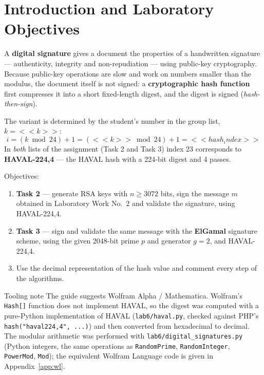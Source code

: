 \documentclass[12pt,a4paper]{article}
\begin{document}
\makereporttitle
\tableofcontents
\newpage

\section{Introduction and Laboratory Objectives}
A \textbf{digital signature} gives a document the properties of a handwritten signature —
authenticity, integrity and non-repudiation — using public-key cryptography. Because public-key
operations are slow and work on numbers smaller than the modulus, the document itself is not
signed: a \textbf{cryptographic hash function} first compresses it into a short fixed-length
digest, and the digest is signed (\emph{hash-then-sign}).

The variant is determined by the student's number in the group list, $k = <<k>>$:
\[
  i = (k \bmod 24) + 1 = (<<k>> \bmod 24) + 1 = <<hash_index>>
\]
In \emph{both} lists of the assignment (Task 2 and Task 3) index 23 corresponds to
\textbf{HAVAL-224,4} — the HAVAL hash with a 224-bit digest and 4 passes.

Objectives:
\begin{enumerate}
  \item \textbf{Task 2} — generate RSA keys with $n \ge 3072$ bits, sign the message $m$ obtained
        in Laboratory Work No.~2 and validate the signature, using HAVAL-224,4.
  \item \textbf{Task 3} — sign and validate the same message with the \textbf{ElGamal} signature
        scheme, using the given 2048-bit prime $p$ and generator $g=2$, and HAVAL-224,4.
  \item Use the decimal representation of the hash value and comment every step of the algorithms.
\end{enumerate}

\begin{infobox}{Tooling note}
The guide suggests Wolfram Alpha / Mathematica. Wolfram's \texttt{Hash[]} function does not
implement HAVAL, so the digest was computed with a pure-Python implementation of HAVAL
(\texttt{lab6/haval.py}, checked against PHP's \texttt{hash("haval224,4", ...)}) and then
converted from hexadecimal to decimal. The modular arithmetic was performed with
\texttt{lab6/digital\_signatures.py} (Python integers, the same operations as \texttt{RandomPrime},
\texttt{RandomInteger}, \texttt{PowerMod}, \texttt{Mod}); the equivalent Wolfram Language code is
given in Appendix~\ref{app:wl}.
\end{infobox}
\end{document}
